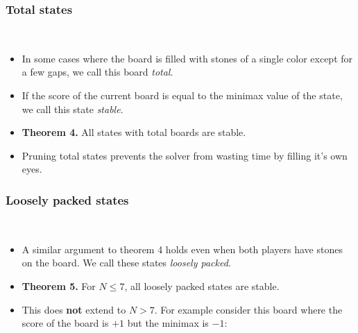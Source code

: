 \documentclass{beamer}
\begin{document}
    \begin{frame}
        \frametitle{Total states}
        \begin{center}
            \cleargoban
            \showgoban[b2,o2]\\\medskip
            \cleargoban
            \showgoban[b2,o2]
        \end{center}
        \begin{itemize}
            \item In some cases where the board is filled with stones of a single color
                except for a few gaps, we call this board \textit{total}.
            \item If the score of the current board is equal to the minimax value of the state,
                we call this state \textit{stable}.
            \pause
            \item \textbf{Theorem 4.} All states with total boards are stable.
            \item Pruning total states prevents the solver from wasting time by filling it's own eyes.
        \end{itemize}
    \end{frame}

    \begin{frame}
        \frametitle{Loosely packed states}
        \begin{center}
            \cleargoban
            \showgoban[b2,h2]\\\medskip
            \cleargoban
            \showgoban[b2,g2]
        \end{center}
        \begin{itemize}
            \item A similar argument to theorem 4 holds even when both players have stones
                on the board. We call these states \textit{loosely packed}.
            \item \textbf{Theorem 5.} For $N\leq7$, all loosely packed states are stable.
            \pause
            \item This does \textbf{not} extend to $N>7$. For example consider this board
                where the score of the board is $+1$ but the minimax is $-1$:
        \end{itemize}
        \begin{center}
            \cleargoban
            \showgoban[b2,j2]
        \end{center}
    \end{frame}
\end{document}
